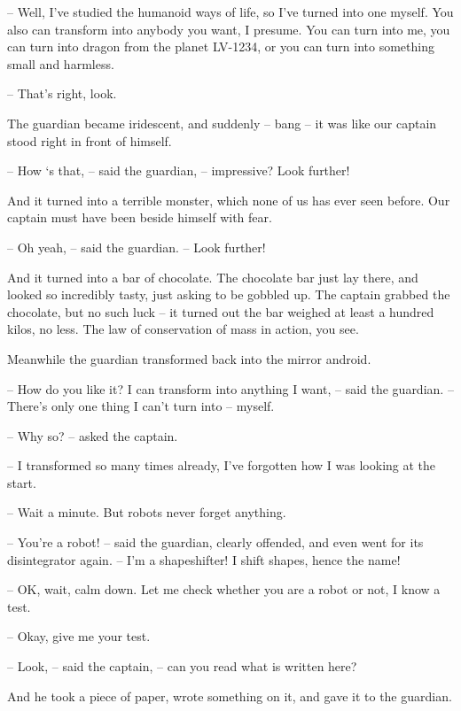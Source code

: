 \documentclass[ebook,twoside,final,openright]{memoir}
\begin{document}
– Well, I've studied the humanoid ways of life, so I’ve turned into one myself. You also can transform into anybody you want, I presume. You can turn into me, you can turn into dragon from the planet LV-1234, or you can turn into something small and harmless.\par
– That's right, look.\par
\par
The guardian became iridescent, and suddenly – bang – it was like our captain stood right in front of himself.\par
– How ‘s that, – said the guardian, – impressive? Look further!\par
And it turned into a terrible monster, which none of us has ever seen before. Our captain must have been beside himself with fear.\par
– Oh yeah, – said the guardian. – Look further!\par
\par
And it turned into a bar of chocolate. The chocolate bar just lay there, and looked so incredibly tasty, just asking to be gobbled up. The captain grabbed the chocolate, but no such luck – it turned out the bar weighed at least a hundred kilos, no less. The law of conservation of mass in action, you see.\par
\par
Meanwhile the guardian transformed back into the mirror android.\par
– How do you like it? I can transform into anything I want, – said the guardian. – There’s only one thing I can’t turn into – myself.\par
– Why so? – asked the captain.\par
– I transformed so many times already, I’ve forgotten how I was looking at the start.\par
– Wait a minute. But robots never forget anything.\par
– You’re a robot! – said the guardian, clearly offended, and even went for its disintegrator again. – I’m a shapeshifter! I shift shapes, hence the name!\par
– OK, wait, calm down. Let me check whether you are a robot or not, I know a test.\par
– Okay, give me your test.\par
– Look, – said the captain, – can you read what is written here?\par
And he took a piece of paper, wrote something on it, and gave it to the guardian.\par
\end{document}
